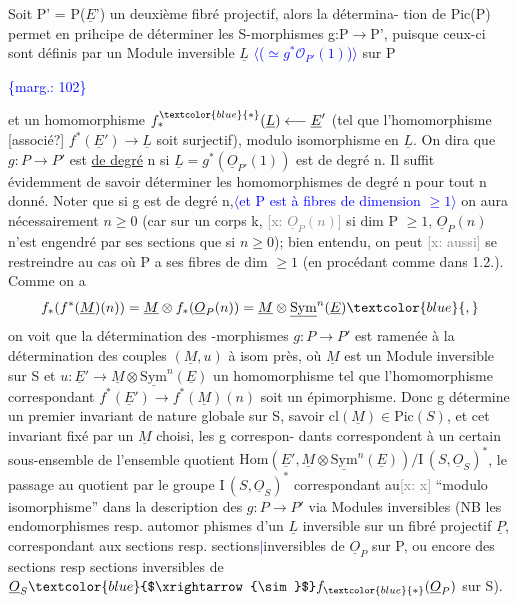 \documentclass[11pt]{article}
\newcommand{\scanpage}[1]{\par\bigskip\noindent{\small\sffamily[scan #1]}\par}
\newcommand{\mspage}[1]{{\small\sffamily[p.\,#1]}}
\newcommand{\hand}[1]{\textcolor{blue}{#1}}
\let\over\relax
\newcommand{\over}[2]{\textcolor{gray}{#1}\textcolor{blue}{\ensuremath{^{\!\nearrow}}#2}}
\newcommand{\inserted}[2][]{\textcolor{blue}{$\langle$#2$\rangle$}}
\newcommand{\margin}[1]{\textcolor{blue}{\{\textsf{marg.:} #1\}}}
\newcommand{\xout}[1]{\textcolor{gray}{[\textsf{x:} #1]}}
\newcommand{\uline}[1]{\underline{#1}}
\newcommand{\unsure}[1]{[#1?]}
\begin{document}
Soit P' = P($\underline{E}$') un deuxième fibré projectif, alors la détermina-%
tion de Pic(P) permet en prihcipe de déterminer les S-morphismes
g:P$\to$P', puisque ceux-ci sont définis par un Module inversible $\underline{L}$ \inserted{($\simeq g^*\mathcal{O}_{P'}(1)$)} sur P

\margin{102}

\clearpage
\scanpage{25/103}
\mspage{\hand{6}}

et  un homomorphisme  $f^{\hand{*}}_{*}(\underline{L}) \longleftarrow \underline{E}'$  (tel que l'homomorphisme \unsure{associé}
$f^{*}(\underline{E}') \to \underline{L}$  soit surjectif), modulo  isomorphisme en $\underline{L}$.  On dira que
$g\colon P \to P'$  est \uline{de degré} n si $\underline{L} = g^{*}(\underline{O}_{P'}(1))$  est de degré n. Il suffit
évidemment de savoir déterminer les homomorphismes de degré n pour tout n
donné.  Noter que si g est de degré n,\inserted[typed]{et P est à fibres de dimension $\geq 1$} on aura nécessairement $n \geq 0$
(car  sur un corps k, \xout{$\underline{O}_P(n)$} si dim P $\geq 1$, $\underline{O}_P(n)$ n'est engendré par ses
sections que si $n \geq 0$); bien entendu, on peut \xout{aussi} se restreindre au cas
où P a ses fibres de dim $\geq 1$ (en procédant comme dans 1.2.).  Comme on a
\[ f_{*}(f^{*}(\underline{M})(n)) = \underline{M} \otimes f_{*}(\underline{O}_P(n)) = \underline{M} \otimes \underline{\mathrm{Sym}}^{n}(\underline{E}) \hand{,} \]
on voit que la détermination des \over{g}{S}-morphismes  $g\colon P \to P'$  est ramenée
à la détermination des couples $(\underline{M},u)$ à isom près, où $\underline{M}$  est un Module
inversible sur S et  $u\colon \underline{E}' \to \underline{M}\otimes\underline{\mathrm{Sym}}^{n}(\underline{E})$  un homomorphisme  tel que
l'homomorphisme correspondant  $f^{*}(\underline{E}') \to f^{*}(\underline{M})(n)$  soit un épimorphisme.
Donc  g détermine un premier invariant de nature globale sur S, savoir
$\mathrm{cl}(\underline{M}) \in \mathrm{Pic}(S)$, et cet invariant fixé par un $\underline{M}$ choisi,  les g correspon-%
dants correspondent à un certain sous-ensemble de l'ensemble quotient
$\mathrm{Hom}(\underline{E}',\underline{M}\otimes\underline{\mathrm{Sym}}^{n}(\underline{E}))/\mathrm{I}\,(S,\underline{O}_S)^{*}$,  le passage au quotient par le groupe
$\mathrm{I}\,(S,\underline{O}_S)^{*}$ correspondant  au\xout{x}  ``modulo isomorphisme'' dans la description
des $g\colon P \to P'$ via Modules inversibles  (NB  les endomorphismes resp. automor
phismes d'un $\underline{L}$ inversible sur un fibré projectif $\underline{P}$, correspondant aux
sections resp. sections\hand{$|$}inversibles de $\underline{O}_P$ sur P,  ou encore des sections
resp sections inversibles de $\underline{O}_S \hand{$\xrightarrow{\sim}$} f_{\hand{*}}(\underline{O}_P)$ sur S).
\end{document}

